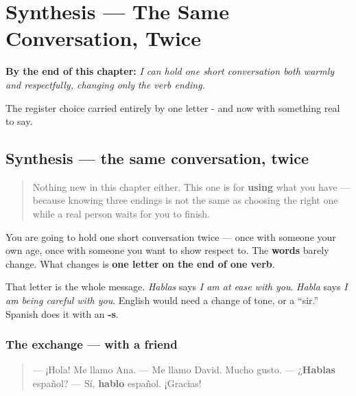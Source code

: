 
\chapter{Synthesis --- The Same Conversation, Twice}
\label{ch:synthesis-ar-singular}

\begin{chapteropening}
\textbf{By the end of this chapter:} \emph{I can hold one short conversation both warmly and respectfully, changing only the verb ending.}

The register choice carried entirely by one letter - and now with something real to say.
\end{chapteropening}

\section[Practice]{Synthesis — the same conversation, twice}

\label{lesson:ES-C06-repaso-hablar}



\begin{quote}
Nothing new in this chapter either. This one is for \textbf{using} what you have — because knowing three endings is not the same as choosing the right one while a real person waits for you to finish.
\end{quote}

\begin{grammarlens}[title={Grammar Lens: what the ending is really saying}]
You are going to hold one short conversation twice — once with someone your own age, once with someone you want to show respect to. The \textbf{words} barely change. What changes is \textbf{one letter on the end of one verb}.

That letter is the whole message. \emph{Hablas} says \emph{I am at ease with you}. \emph{Habla} says \emph{I am being careful with you}. English would need a change of tone, or a \textquotedblleft{}sir.\textquotedblright{} Spanish does it with an \textbf{-s}.
\end{grammarlens}

\subsection*{The exchange — with a friend}
\begin{quote}
— ¡Hola! Me llamo Ana. — Me llamo David. Mucho gusto. — ¿\textbf{Hablas} español? — Sí, \textbf{hablo} español. ¡Gracias!
\end{quote}

